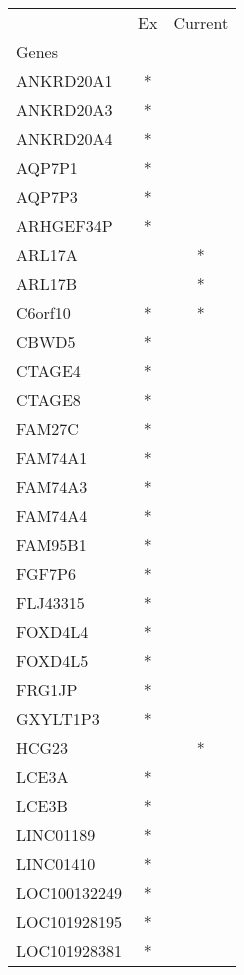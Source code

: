 \begin{tabular}{lcc}
\toprule
{} & Ex & Current \\
Genes              &    &         \\
\midrule
ANKRD20A1          &  * &         \\
ANKRD20A3          &  * &         \\
ANKRD20A4          &  * &         \\
AQP7P1             &  * &         \\
AQP7P3             &  * &         \\
ARHGEF34P          &  * &         \\
ARL17A             &    &       * \\
ARL17B             &    &       * \\
C6orf10            &  * &       * \\
CBWD5              &  * &         \\
CTAGE4             &  * &         \\
CTAGE8             &  * &         \\
FAM27C             &  * &         \\
FAM74A1            &  * &         \\
FAM74A3            &  * &         \\
FAM74A4            &  * &         \\
FAM95B1            &  * &         \\
FGF7P6             &  * &         \\
FLJ43315           &  * &         \\
FOXD4L4            &  * &         \\
FOXD4L5            &  * &         \\
FRG1JP             &  * &         \\
GXYLT1P3           &  * &         \\
HCG23              &    &       * \\
LCE3A              &  * &         \\
LCE3B              &  * &         \\
LINC01189          &  * &         \\
LINC01410          &  * &         \\
LOC100132249       &  * &         \\
LOC101928195       &  * &         \\
LOC101928381       &  * &         \\

\end{tabular}
